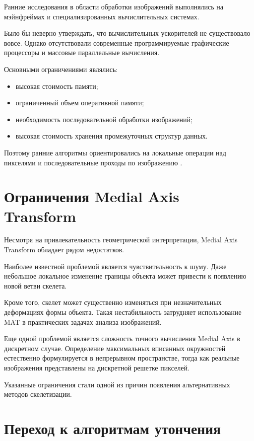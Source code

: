 \documentclass[12pt,a4paper]{article}
\begin{document}
Ранние исследования в области обработки изображений выполнялись на мэйнфреймах и специализированных вычислительных системах.

Было бы неверно утверждать, что вычислительных ускорителей не существовало вовсе. Однако отсутствовали современные программируемые графические процессоры и массовые параллельные вычисления.

Основными ограничениями являлись:

\begin{itemize}
	\item высокая стоимость памяти;
	\item ограниченный объем оперативной памяти;
	\item необходимость последовательной обработки изображений;
	\item высокая стоимость хранения промежуточных структур данных.
\end{itemize}

Поэтому ранние алгоритмы ориентировались на локальные операции над пикселями и последовательные проходы по изображению \cite{pfaltz1966}.

\section{Ограничения Medial Axis Transform}

Несмотря на привлекательность геометрической интерпретации, Medial Axis Transform обладает рядом недостатков.

Наиболее известной проблемой является чувствительность к шуму. Даже небольшое локальное изменение границы объекта может привести к появлению новой ветви скелета.

Кроме того, скелет может существенно изменяться при незначительных деформациях формы объекта. Такая нестабильность затрудняет использование MAT в практических задачах анализа изображений.

Еще одной проблемой является сложность точного вычисления Medial Axis в дискретном случае. Определение максимальных вписанных окружностей естественно формулируется в непрерывном пространстве, тогда как реальные изображения представлены на дискретной решетке пикселей.

Указанные ограничения стали одной из причин появления альтернативных методов скелетизации.

\section{Переход к алгоритмам утончения}
\end{document}
